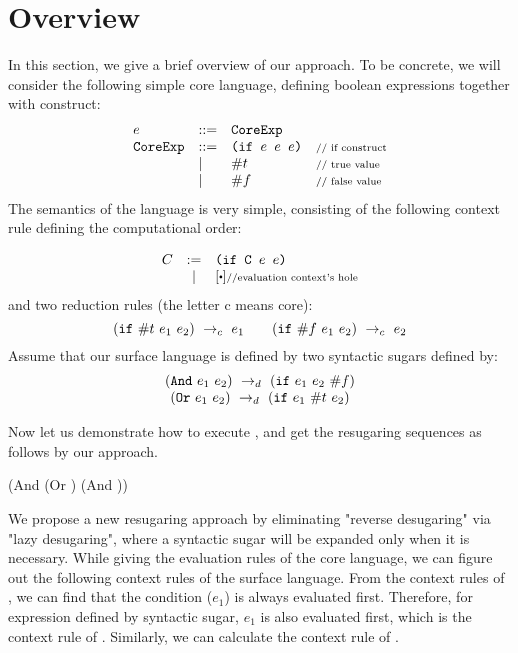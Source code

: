 \section{Overview}
\label{sec2}


In this section, we give a brief overview of our approach. To be concrete, we will consider the following simple core language, defining boolean expressions together with  construct:
\[
\begin{array}{lllll}
e &::=& \mbox{\tt CoreExp}\\
\mbox{\tt CoreExp} &::=& \texttt{(if~$e$~$e$~$e$)} &\mbox{{\scriptsize // if construct}}\\
& |& \#t  & \mbox{{\scriptsize // true value}}\\
& |& \#f & \mbox{{\scriptsize // false value}}
\end{array}
\]
The semantics of the language is very simple, consisting of the following context rule defining the computational order:

\[
\begin{array}{lcl}
C &:=& \Code{(if C $e$ $e$)}\\
&|&[\bigcdot]\note{//evaluation context's hole}\\
\end{array}
\]
and two reduction rules (the letter c means core):
\[
\centering
 \redc{(\m{if}~\true~e_1~e_2)}{e_1}  \qquad \redc{(\m{if}~\false~e_1~e_2)}{e_2} 
\]
Assume that our surface language is defined by two syntactic sugars defined by:
\[
\begin{array}{c}
(\mbox{\tt And}~e_1~e_2) ~\rightarrow_d~ (\mbox{\tt if}~e_1~e_2~\#f)\\
(\mbox{\tt Or}~e_1~e_2) ~\rightarrow_d~ (\mbox{\tt if}~e_1~\#t~e_2)
\end{array}
\]


Now let us demonstrate how to execute , and get the resugaring sequences as follows by our approach.

{\scriptsize
\begin{Codes}
    (And (Or \true \false) (And \false \true))
\end{Codes}
}


We propose a new resugaring approach by eliminating "reverse desugaring" via "lazy desugaring", where a syntactic sugar will be expanded only when it is necessary. While giving the evaluation rules of the core language, we can figure out the following context rules of the surface language. From the context rules of , we can find that the condition ($e_1$) is always evaluated first. Therefore, for expression  defined by syntactic sugar, $e_1$ is also evaluated first, which is the context rule of . Similarly, we can calculate the context rule of .

